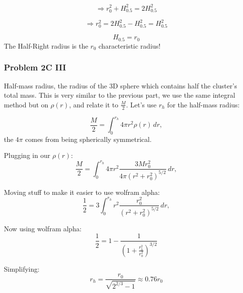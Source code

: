 \begin{equation}
    \Rightarrow r_0^2 + H_{0.5}^2 = 2H_{0.5}^2
\end{equation}

\begin{equation}
    \Rightarrow r_0^2 = 2H_{0.5}^2 -  H_{0.5}^2   = H_{0.5}^2
\end{equation}


\begin{equation}
    \boxed{H_{0.5} = r_0}
\end{equation}
The Half-Right radius is the $r_0$ characteristic radius!

\subsubsection*{Problem 2C III}

Half-mass radius, the radius of the 3D sphere which contains half the cluster’s total mass. This is very similar to the previous part, we use the same integral method but on $\rho(r)$, and relate it to $\frac{M}{2}$. Let's use $r_h$ for the half-mass radius:

\begin{equation}
\frac{M}{2} = \int_0^{r_h} 4\pi r^2 \rho(r) \, dr ,
\end{equation}
the $4\pi$ comes from being spherically symmetrical. 

Plugging in our $\rho(r)$:
\begin{equation}
\frac{M}{2} = \int_0^{r_h} 4\pi r^2 \frac{3 M r_0^2}{4 \pi (r^2 + r_0^2)^{5/2}} \, dr ,
\end{equation}

Moving stuff to make it easier to use wolfram alpha:
\begin{equation}
\frac{1}{2} = 3 \int_0^{r_h}  r^2 \frac{ r_0^2}{ (r^2 + r_0^2)^{5/2}} \, dr ,
\end{equation}

Now using wolfram alpha:
\begin{equation}
\frac{1}{2} = 1 - \frac{1}{\left(1 + \frac{r_h^2}{r_0^2}\right)^{3/2}}
\end{equation}

Simplifying: 
\begin{equation}
\boxed{r_h = \frac{r_0}{\sqrt{2^{2/3} -1}} \approx 0.76 r_0} 
\end{equation}



